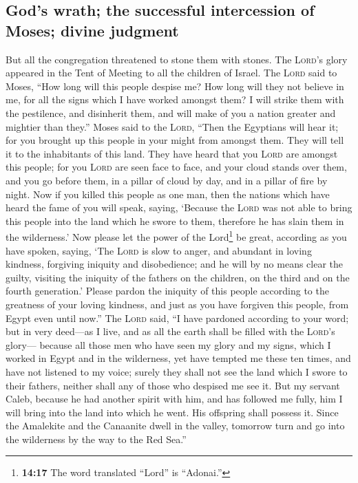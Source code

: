 \hypertarget{gods-wrath-the-successful-intercession-of-moses-divine-judgment}{%
\subsection{God's wrath; the successful intercession of Moses; divine
judgment}\label{gods-wrath-the-successful-intercession-of-moses-divine-judgment}}

 But all the congregation threatened to stone them with
stones. The \textsc{Lord}'s glory appeared in the Tent of Meeting to all
the children of Israel.  The \textsc{Lord} said to Moses,
``How long will this people despise me? How long will they not believe
in me, for all the signs which I have worked amongst them?
 I will strike them with the pestilence, and disinherit
them, and will make of you a nation greater and mightier than they.''
 Moses said to the \textsc{Lord}, ``Then the Egyptians
will hear it; for you brought up this people in your might from amongst
them.  They will tell it to the inhabitants of this land.
They have heard that you \textsc{Lord} are amongst this people; for you
\textsc{Lord} are seen face to face, and your cloud stands over them,
and you go before them, in a pillar of cloud by day, and in a pillar of
fire by night.  Now if you killed this people as one man,
then the nations which have heard the fame of you will speak, saying,
 `Because the \textsc{Lord} was not able to bring this
people into the land which he swore to them, therefore he has slain them
in the wilderness.'  Now please let the power of the
Lord\footnote{\textbf{14:17} The word translated ``Lord'' is ``Adonai.''}
be great, according as you have spoken, saying,  `The
\textsc{Lord} is slow to anger, and abundant in loving kindness,
forgiving iniquity and disobedience; and he will by no means clear the
guilty, visiting the iniquity of the fathers on the children, on the
third and on the fourth generation.'  Please pardon the
iniquity of this people according to the greatness of your loving
kindness, and just as you have forgiven this people, from Egypt even
until now.''  The \textsc{Lord} said, ``I have pardoned
according to your word;  but in very deed---as I live,
and as all the earth shall be filled with the \textsc{Lord}'s glory---
 because all those men who have seen my glory and my
signs, which I worked in Egypt and in the wilderness, yet have tempted
me these ten times, and have not listened to my voice; 
surely they shall not see the land which I swore to their fathers,
neither shall any of those who despised me see it.  But
my servant Caleb, because he had another spirit with him, and has
followed me fully, him I will bring into the land into which he went.
His offspring shall possess it.  Since the Amalekite and
the Canaanite dwell in the valley, tomorrow turn and go into the
wilderness by the way to the Red Sea.''

